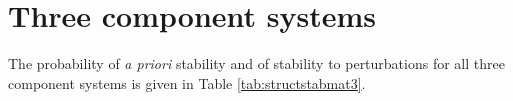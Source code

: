 \documentclass{amsart}
\theoremstyle{definition}
\theoremstyle{remark}
\numberwithin{equation}{section}
\begin{document}




\section{Three component systems}

The probability of \emph{a priori} stability and of stability to perturbations for all three component systems is given in Table \ref{tab:structstabmat3}.
\end{document}
